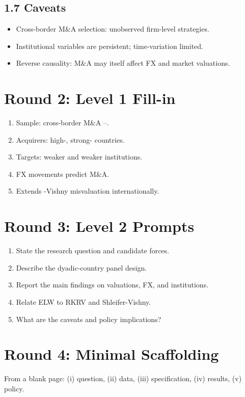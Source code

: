 \documentclass[11pt]{article}
\newcommand{\blank}[1]{\underline{\hspace{#1}}}
\begin{document}
\subsection*{1.7 Caveats}
\begin{alertbox}
\begin{itemize}
\item Cross-border M\&A selection: unobserved firm-level strategies.
\item Institutional variables are persistent; time-variation limited.
\item Reverse causality: M\&A may itself affect FX and market valuations.
\end{itemize}
\end{alertbox}

\section*{Round 2: Level 1 Fill-in}
\begin{enumerate}
\item Sample: cross-border M\&A \blank{1cm}--\blank{1cm}.
\item Acquirers: high-\blank{2cm}, strong-\blank{2cm} countries.
\item Targets: weaker \blank{2cm} and weaker institutions.
\item FX movements predict \blank{2cm} M\&A.
\item Extends \blank{2cm}-Vishny misvaluation internationally.
\end{enumerate}

\section*{Round 3: Level 2 Prompts}
\begin{enumerate}
\item State the research question and candidate forces.
\item Describe the dyadic-country panel design.
\item Report the main findings on valuations, FX, and institutions.
\item Relate ELW to RKRV and Shleifer-Vishny.
\item What are the caveats and policy implications?
\end{enumerate}

\section*{Round 4: Minimal Scaffolding}
From a blank page: (i) question, (ii) data, (iii) specification, (iv) results, (v) policy.
\end{document}
